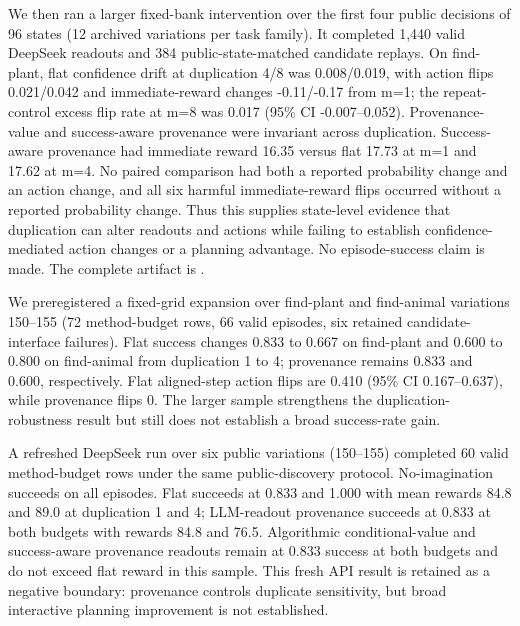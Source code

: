 \documentclass[10pt]{article}
\begin{document}
We then ran a larger fixed-bank intervention over the first four public decisions of 96 states (12 archived variations per task family). It completed 1,440 valid DeepSeek readouts and 384 public-state-matched candidate replays. On find-plant, flat confidence drift at duplication 4/8 was 0.008/0.019, with action flips 0.021/0.042 and immediate-reward changes -0.11/-0.17 from m=1; the repeat-control excess flip rate at m=8 was 0.017 (95\% CI -0.007--0.052). Provenance-value and success-aware provenance were invariant across duplication. Success-aware provenance had immediate reward 16.35 versus flat 17.73 at m=1 and 17.62 at m=4. No paired comparison had both a reported probability change and an action change, and all six harmful immediate-reward flips occurred without a reported probability change. Thus this supplies state-level evidence that duplication can alter readouts and actions while failing to establish confidence-mediated action changes or a planning advantage. No episode-success claim is made. The complete artifact is \texttt{}.

We preregistered a fixed-grid expansion over find-plant and find-animal variations 150--155 (72 method-budget rows, 66 valid episodes, six retained candidate-interface failures). Flat success changes 0.833 to 0.667 on find-plant and 0.600 to 0.800 on find-animal from duplication 1 to 4; provenance remains 0.833 and 0.600, respectively. Flat aligned-step action flips are 0.410 (95\% CI 0.167--0.637), while provenance flips 0. The larger sample strengthens the duplication-robustness result but still does not establish a broad success-rate gain.

A refreshed DeepSeek run over six public \texttt{} variations (150--155) completed 60 valid method-budget rows under the same public-discovery protocol. No-imagination succeeds on all episodes. Flat succeeds at 0.833 and 1.000 with mean rewards 84.8 and 89.0 at duplication 1 and 4; LLM-readout provenance succeeds at 0.833 at both budgets with rewards 84.8 and 76.5. Algorithmic conditional-value and success-aware provenance readouts remain at 0.833 success at both budgets and do not exceed flat reward in this sample. This fresh API result is retained as a negative boundary: provenance controls duplicate sensitivity, but broad interactive planning improvement is not established.
\end{document}
